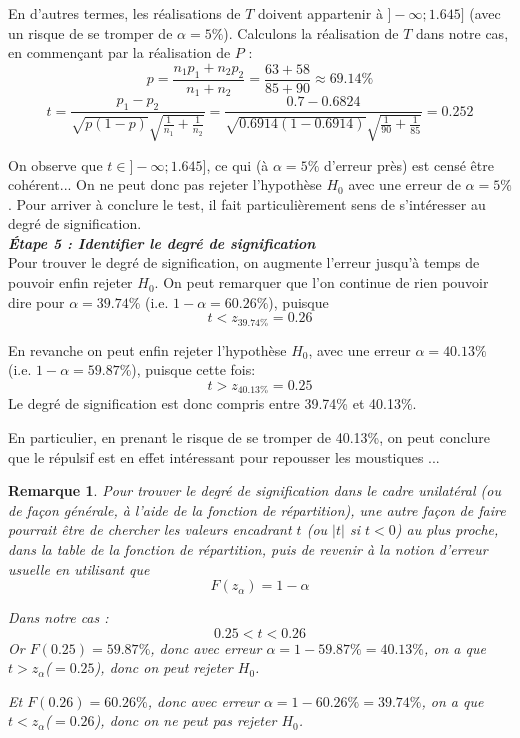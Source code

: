 \documentclass[a4paper,oneside,12pt]{article}
\theoremstyle{plain}
\newtheorem*{remark}{Remarque}
\begin{document}
En d'autres termes, les réalisations de $T$ doivent appartenir à $]-\infty;1.645]$ (avec un risque de se tromper de $\alpha = 5\%$). Calculons la réalisation de $T$ dans notre cas, en commençant par la réalisation de $P$ :
$$ p = \frac{n_1p_1 + n_2p_2}{n_1+n_2} = \frac{63 + 58}{85+90} \approx 69.14\%$$
$$ t = \frac{p_1 -p_2}{\sqrt{p(1-p)}\sqrt{\frac{1}{n_1}+\frac{1}{n_2}}} =  \frac{0.7 -0.6824}{\sqrt{0.6914(1-0.6914)}\sqrt{\frac{1}{90}+\frac{1}{85}}} = 0.252$$
    
On observe que $t\in ]-\infty;1.645]$, ce qui (à $\alpha = 5\%$ d'erreur près) est censé être cohérent... On ne peut donc pas rejeter l'hypothèse $H_0$ avec une erreur de $\alpha = 5\%$. Pour arriver à conclure le test, il fait particulièrement sens de s'intéresser au degré de signification.\\
    
\textit{\textbf{Étape 5 : Identifier le degré de signification}}\\
Pour trouver le degré de signification, on augmente l'erreur jusqu'à temps de pouvoir enfin rejeter $H_0$. On peut remarquer que l'on continue de rien pouvoir dire pour $\alpha = 39.74\%$ (i.e. $1-\alpha = 60.26\%$), puisque 
$$t< z_{39.74\%} = 0.26$$

En revanche on peut enfin rejeter l'hypothèse $H_0$, avec une erreur $\alpha = 40.13\%$ (i.e. $1-\alpha = 59.87\%$), puisque cette fois: 
$$t> z_{40.13\%} = 0.25$$
Le degré de signification est donc compris entre 39.74\% et 40.13\%. 
    
En particulier, en prenant le risque de se tromper de 40.13\%, on peut conclure que le répulsif est en effet intéressant pour repousser les moustiques ...


\begin{remark}
Pour trouver le degré de signification dans le cadre unilatéral (ou de façon générale, à l'aide de la fonction de répartition), une autre façon de faire pourrait être de chercher les valeurs encadrant $t$ (ou $|t|$ si $t<0$) au plus proche, dans la table de la fonction de répartition, puis de revenir à la notion d'erreur usuelle en utilisant que $$F(z_\alpha) = 1-\alpha$$

Dans notre cas :
$$0.25<t<0.26$$
Or $F(0.25) = 59.87\%$, donc avec erreur $\alpha = 1-59.87\% = 40.13\%$, on a que $t>z_\alpha$($=0.25$), donc on peut rejeter $H_0$.

\noindent Et $F(0.26) = 60.26\%$, donc avec erreur $\alpha = 1-60.26\% = 39.74\%$, on a que $t<z_\alpha$($=0.26$), donc on ne peut pas rejeter $H_0$.
\end{remark}
\end{document}
